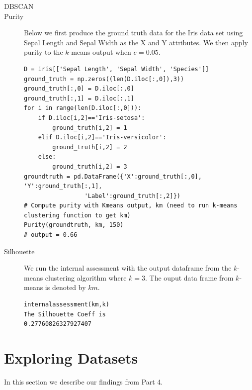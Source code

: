 \documentclass[psamsfonts,onesided,10pt]{amsart}
\begin{document}
\begin{description}
\item[DBSCAN] \todo{}
\item[Purity] Below we first produce the ground truth data for the Iris data set using Sepal Length 
and Sepal Width as the X and Y attributes. We then apply purity to the $k$-means output when $e=0.05$. 
\begin{verbatim}
D = iris[['Sepal Length', 'Sepal Width', 'Species']]
ground_truth = np.zeros((len(D.iloc[:,0]),3))
ground_truth[:,0] = D.iloc[:,0]
ground_truth[:,1] = D.iloc[:,1]
for i in range(len(D.iloc[:,0])):
    if D.iloc[i,2]=='Iris-setosa':
        ground_truth[i,2] = 1
    elif D.iloc[i,2]=='Iris-versicolor':
        ground_truth[i,2] = 2
    else:
        ground_truth[i,2] = 3
groundtruth = pd.DataFrame({'X':ground_truth[:,0], 'Y':ground_truth[:,1], 
                 'Label':ground_truth[:,2]})       
# Compute purity with Kmeans output, km (need to run k-means clustering function to get km)
Purity(groundtruth, km, 150)
# output = 0.66
\end{verbatim}
\item[Silhouette] We run the internal assessment with the output dataframe from the 
$k$-means clustering algorithm where $k=3$. The ouput data frame from $k$-means is denoted by $km$.
\begin{verbatim}
internalassessment(km,k)
The Silhouette Coeff is 
0.27760826327927407
\end{verbatim}
\end{description}

\section{Exploring Datasets}
In this section we describe our findings from Part 4. \todo{}
\end{document}
